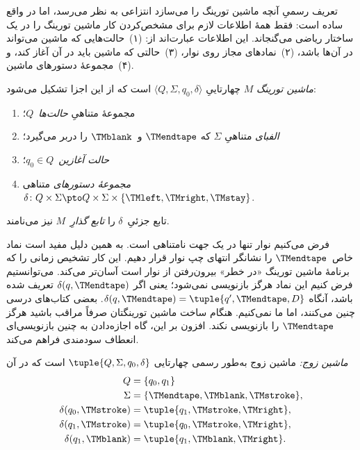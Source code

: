 \documentclass[../../../include/open-logic-section]{subfiles}
\begin{document}

\begin{explain}
تعریف رسمیِ آنچه ماشین تورینگ را می‌سازد انتزاعی به نظر می‌رسد، اما
در واقع ساده است: فقط همهٔ اطلاعات لازم برای مشخص‌کردن کار ماشین
تورینگ را در یک ساختار ریاضی می‌گنجاند. این اطلاعات عبارت‌اند از:
(۱)~حالت‌هایی که ماشین می‌تواند در آن‌ها باشد، (۲)~نمادهای مجاز روی
نوار، (۳)~حالتی که ماشین باید در آن آغاز کند، و (۴)~مجموعهٔ دستورهای
ماشین.
\end{explain}

\begin{defn}
\emph{ماشین تورینگ} $M$ چهارتاییِ
$\langle Q,\Sigma,q_0,\delta\rangle$ است که از این اجزا تشکیل می‌شود:
\begin{enumerate}
\item مجموعهٔ متناهیِ \emph{حالت‌ها}~$Q$؛
\item \emph{الفبای} متناهیِ $\Sigma$ که $\TMendtape$ و~$\TMblank$ را
  دربر می‌گیرد؛
\item \emph{حالت آغازین}~$q_0\in Q$؛
\item \emph{مجموعهٔ دستورهای} متناهی
  $\delta\colon Q\times\Sigma
  \pto Q\times\Sigma\times\{\TMleft,\TMright,\TMstay\}$.
\end{enumerate}
تابع جزئیِ~$\delta$ را \emph{تابع گذارِ}~$M$ نیز می‌نامند.
\end{defn}

\begin{explain}
فرض می‌کنیم نوار تنها در یک جهت نامتناهی است. به همین دلیل مفید است
نماد خاص~$\TMendtape$ را نشانگر انتهای چپ نوار قرار دهیم. این کار
تشخیص زمانی را که برنامهٔ ماشین تورینگ «در خطر» بیرون‌رفتن از نوار
است آسان‌تر می‌کند. می‌توانستیم فرض کنیم این نماد هرگز بازنویسی
نمی‌شود؛ یعنی اگر $\delta(q,\TMendtape)$ تعریف شده باشد، آنگاه
$\delta(q,\TMendtape)=\tuple{q',\TMendtape,D}$. بعضی کتاب‌های درسی
چنین می‌کنند، اما ما نمی‌کنیم. هنگام ساخت ماشین تورینگتان صرفاً
مراقب باشید هرگز $\TMendtape$ را بازنویسی نکند. افزون بر این، گاه
اجازه‌دادن به چنین بازنویسی‌ای انعطاف سودمندی فراهم می‌کند.
\end{explain}

\begin{ex}
\emph{ماشین زوج:} ماشین زوج به‌طور رسمی چهارتایی
$\tuple{Q,\Sigma,q_0,\delta}$ است که در آن
\begin{align*}
Q & = \{ q_0, q_1 \} \\
\Sigma & = \{ \TMendtape, \TMblank, \TMstroke \}, \\
\delta(q_0, \TMstroke) & = \tuple{q_1, \TMstroke, \TMright},\\
\delta(q_1, \TMstroke) & = \tuple{q_0, \TMstroke, \TMright},\\
\delta(q_1, \TMblank)  & = \tuple{q_1, \TMblank, \TMright}.
\end{align*}
\end{ex}
\end{document}

